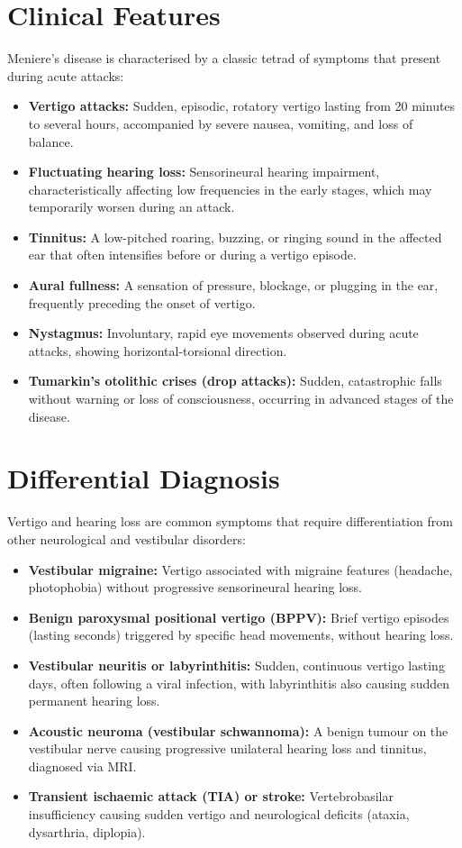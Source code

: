 \section*{Clinical Features}
Meniere's disease is characterised by a classic tetrad of symptoms that present during acute attacks:
\begin{itemize}
    \item \textbf{Vertigo attacks:} Sudden, episodic, rotatory vertigo lasting from 20 minutes to several hours, accompanied by severe nausea, vomiting, and loss of balance.
    \item \textbf{Fluctuating hearing loss:} Sensorineural hearing impairment, characteristically affecting low frequencies in the early stages, which may temporarily worsen during an attack.
    \item \textbf{Tinnitus:} A low-pitched roaring, buzzing, or ringing sound in the affected ear that often intensifies before or during a vertigo episode.
    \item \textbf{Aural fullness:} A sensation of pressure, blockage, or plugging in the ear, frequently preceding the onset of vertigo.
    \item \textbf{Nystagmus:} Involuntary, rapid eye movements observed during acute attacks, showing horizontal-torsional direction.
    \item \textbf{Tumarkin's otolithic crises (drop attacks):} Sudden, catastrophic falls without warning or loss of consciousness, occurring in advanced stages of the disease.
\end{itemize}

\section*{Differential Diagnosis}
Vertigo and hearing loss are common symptoms that require differentiation from other neurological and vestibular disorders:
\begin{itemize}
    \item \textbf{Vestibular migraine:} Vertigo associated with migraine features (headache, photophobia) without progressive sensorineural hearing loss.
    \item \textbf{Benign paroxysmal positional vertigo (BPPV):} Brief vertigo episodes (lasting seconds) triggered by specific head movements, without hearing loss.
    \item \textbf{Vestibular neuritis or labyrinthitis:} Sudden, continuous vertigo lasting days, often following a viral infection, with labyrinthitis also causing sudden permanent hearing loss.
    \item \textbf{Acoustic neuroma (vestibular schwannoma):} A benign tumour on the vestibular nerve causing progressive unilateral hearing loss and tinnitus, diagnosed via MRI.
    \item \textbf{Transient ischaemic attack (TIA) or stroke:} Vertebrobasilar insufficiency causing sudden vertigo and neurological deficits (ataxia, dysarthria, diplopia).
\end{itemize}

